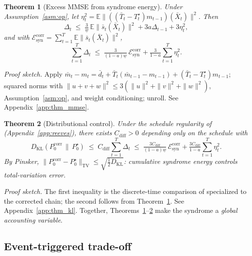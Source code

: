 \documentclass{article}
\theoremstyle{plain}
\newtheorem{theorem}{Theorem}[section]
\theoremstyle{definition}
\theoremstyle{remark}
\begin{document}
\begin{theorem}[Excess MMSE from syndrome energy]\label{thm:mmse}
Under Assumption~\ref{asm:op}, let
\(\eta_t^2 = \mathbb{E}\|((\bar T_t - T_t^\star) m_{t-1})(\bar X_t)\|^2\). Then
\begin{equation}
\Delta_t \;\le\; \tfrac{3}{\underline w}\,\mathbb{E}\|\bar s_t(\bar X_t)\|^2
 + 3 a \Delta_{t-1} + 3\eta_t^2,
\label{eq:mmse_recursion}
\end{equation}
and with
\(\mathcal{E}^{\mathrm{corr}}_{\mathrm{syn}} = \sum_{t=1}^T \mathbb{E}\|\bar
s_t(\bar X_t)\|^2\),
\begin{equation}
\sum_{t=1}^T \Delta_t
\;\le\;
\tfrac{3}{(1-a)\underline w}\,\mathcal{E}^{\mathrm{corr}}_{\mathrm{syn}}
 + \tfrac{3}{1-a}\sum_{t=1}^T \eta_t^2.
\label{eq:mmse_sum}
\end{equation}
\end{theorem}

\emph{Proof sketch.} Apply \(\bar m_t - m_t = \bar d_t + \bar T_t(\bar
m_{t-1} - m_{t-1}) + (\bar T_t - T_t^\star)m_{t-1}\); squared norms with
\(\|u+v+w\|^2 \le 3(\|u\|^2+\|v\|^2+\|w\|^2)\), Assumption~\ref{asm:op}, and
weight conditioning; unroll. See Appendix~\ref{app:thm_mmse}.

\begin{theorem}[Distributional control]\label{thm:kl}
Under the schedule regularity of \citep{reeves2025itproofs}
(Appendix~\ref{app:reeves}), there exists \(C_{\mathrm{diff}}>0\) depending
only on the schedule with
\begin{equation}
D_{\mathrm{KL}}(P_0^{\mathrm{corr}} \,\|\, P_0^\star)
\;\le\;
C_{\mathrm{diff}}\!\sum_{t=1}^T \Delta_t
\;\le\;
\tfrac{3C_{\mathrm{diff}}}{(1-a)\underline w}\,\mathcal{E}^{\mathrm{corr}}_{\mathrm{syn}}
 + \tfrac{3C_{\mathrm{diff}}}{1-a}\sum_{t=1}^T \eta_t^2.
\label{eq:kl_bound}
\end{equation}
By Pinsker, \(\|P_0^{\mathrm{corr}} - P_0^\star\|_{\mathrm{TV}} \le
\sqrt{\tfrac12 D_{\mathrm{KL}}}\): cumulative syndrome energy controls
total-variation error.
\end{theorem}

\emph{Proof sketch.} The first inequality is the discrete-time comparison
of \citep{reeves2025itproofs} specialized to the corrected chain; the
second follows from Theorem~\ref{thm:mmse}. See Appendix~\ref{app:thm_kl}.
Together, Theorems~\ref{thm:mmse}--\ref{thm:kl} make the syndrome a
\emph{global accounting variable}.

\subsection{Event-triggered trade-off}
\end{document}
